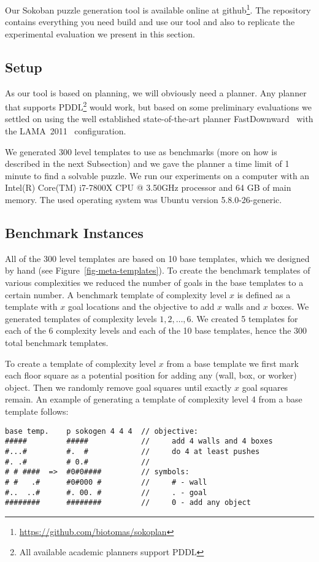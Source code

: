 \documentclass[runningheads]{llncs}
\begin{document}
Our Sokoban puzzle generation tool is available online at github\footnote{\url{https://github.com/biotomas/sokoplan}}.
The repository contains everything you need build and use our tool and also to replicate
the experimental evaluation we present in this section.

\subsection{Setup}
As our tool is based on planning, we will obviously need a planner. Any planner that supports PDDL\footnote{All available academic planners support PDDL} would work, but based on some preliminary evaluations we
settled on using the well established state-of-the-art planner FastDownward~\cite{helmert2006fast} with
the LAMA~2011~\cite{richter2011lama} configuration.

We generated 300 level templates to use as benchmarks (more on how is described in the next Subsection)
and we gave the planner a time limit of 1 minute to find a solvable puzzle. We run our experiments
on a computer with an Intel(R) Core(TM) i7-7800X CPU @ 3.50GHz processor and 64 GB of main memory.
The used operating system was Ubuntu version 5.8.0-26-generic.

\subsection{Benchmark Instances}
All of the 300 level templates are based on 10 base templates, which we designed by hand (see
Figure~\ref{fig-meta-templates}). To create the benchmark templates of various complexities
we reduced the number of goals in the base templates to a certain number. 
A benchmark template of complexity level $x$ is defined as a template with $x$ goal locations and
the objective to add $x$ walls and $x$ boxes.
We generated templates of complexity levels $1,2,\ldots,6$. We created 5 templates for each of 
the 6 complexity levels and each of the 10 base templates, hence the 300 total benchmark templates.

To create a template of complexity level $x$ from a base template we first mark each floor square
as a potential position for adding any (wall, box, or worker) object. Then we randomly remove
goal squares until exactly $x$ goal squares remain. An example of generating a template of complexity
level 4 from a base template follows:
\begin{verbatim}
base temp.    p sokogen 4 4 4  // objective:
#####         #####            //     add 4 walls and 4 boxes
#...#         #.  #            //     do 4 at least pushes 
#. .#         # 0.#            // 
# # ####  =>  #0#0####         // symbols: 
# #   .#      #0#000 #         //     # - wall     
#..  ..#      #. 00. #         //     . - goal     
########      ########         //     0 - add any object
\end{verbatim}
\end{document}
